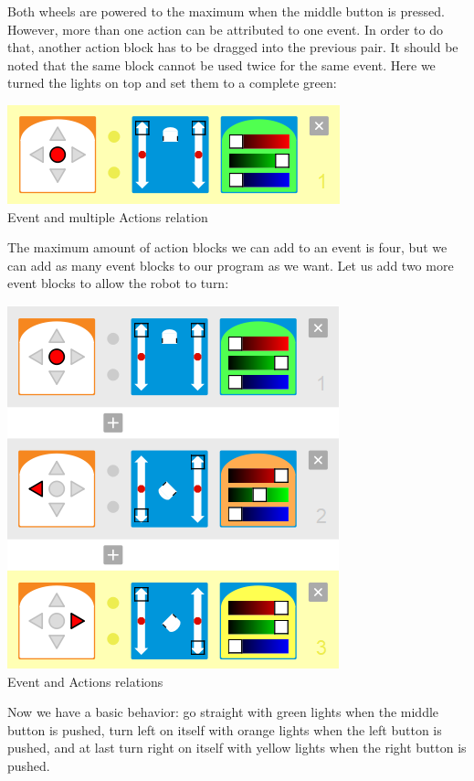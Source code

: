 \documentclass{scrreprt}
\begin{document}
Both wheels are powered to the maximum when the middle button is pressed. However, more than one action can be attributed to one event. 
In order to do that, another action block has to be dragged into the previous pair. It should be noted that the same block cannot be used twice for the same event. 
Here we turned the lights on top and set them to a complete green:\\
\begin{center}
  \includegraphics[scale=0.5]{./VPL/middlebtn_forward_green}\\
  Event and multiple Actions relation
\end{center}

The maximum amount of action blocks we can add to an event is four, but we can add as many event blocks to our program as we want. 
Let us add two more event blocks to allow the robot to turn:\\
\begin{center}
  \includegraphics[scale=0.5]{./VPL/middlebtn_3E}\\
  Event and Actions relations
\end{center}

Now we have a basic behavior: go straight with green lights when the middle button is pushed, turn left on itself with orange lights when the left button is pushed, 
and at last turn right on itself with yellow lights when the right button is pushed.\\
\end{document}
